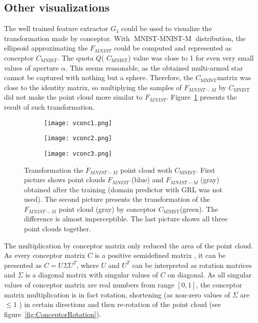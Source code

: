 \documentclass[shortabstract, inz, english]{iithesis}
\DeclareMathOperator{\mnistM}{MNIST-MNIST-M}
\DeclareMathOperator{\QCM}{MNIST}
\newcommand{\mnist}{$\overline{\mnistM}$ }
\newcommand{\CM}{$C_{\QCM}$}
\begin{document}
\subsection{Other visualizations}
The well trained feature extractor $G_{3}$ could be used to visualize the transformation made by conceptor. With \mnist distribution, the ellipsoid approximating the $F_{MNIST}$ could be computed and represented as conceptor \CM. The quota $Q$( \CM) value was close to 1 for even very small values of aperture $\alpha$. This seems reasonable, as the obtained multi-armed star cannot be captured with nothing but a sphere. Therefore, the \CM matrix was close to the identity matrix, so multiplying the samples of $F_{MNIST-M}$ by \CM did not make the point cloud more similar to $F_{MNIST}$. Figure~\ref{fig:vconc} presents the result of such transformation.
\begin{figure}[!htpb]%
    \centering
    
    \begin{subfigure}[b]{0.27\textwidth}
        \texttt{[image: vconc1.png]}
    \end{subfigure}%
    \begin{subfigure}[b]{0.27\textwidth}
        \texttt{[image: vconc2.png]}
    \end{subfigure}%
    \begin{subfigure}[b]{0.27\textwidth}
        \texttt{[image: vconc3.png]}
    \end{subfigure}%

    \caption{Transformation the $F_{MNIST-M}$ point cloud woth \CM. First picture shows point clouds $F_{MNIST}$ (blue) and $F_{MNIST-M}$ (gray) obtained after the training (domain predictor with GRL was not used). The second picture presents the transformation of the $F_{MNIST-M}$ point cloud (gray) by conceptor \CM (green). The difference is almost imperceptible. The last picture shows all three point clouds together.}%
    \label{fig:vconc}%
\end{figure}
\par
The multiplication by conceptor matrix only reduced the area of the point cloud. As every conceptor matrix $C$ is a positive semidefined matrix \cite{conc}, it can be presented as $C = U\Sigma U^{T}$, where $U$ and $U^{T}$ can be interpreted as rotation matrices and $\Sigma$ is a diagonal matrix with singular values of $C$ on diagonal. As all singular values of conceptor matrix are real numbers from range $[0,1]$, the conceptor matrix multiplication is in fact rotation, shortening (as non-zero values of $\Sigma$ are $\leq 1$ \cite{conc}) in certain directions and then re-rotation of the point cloud (see figure~\ref{fig:ConceptorRotation}).
\end{document}
